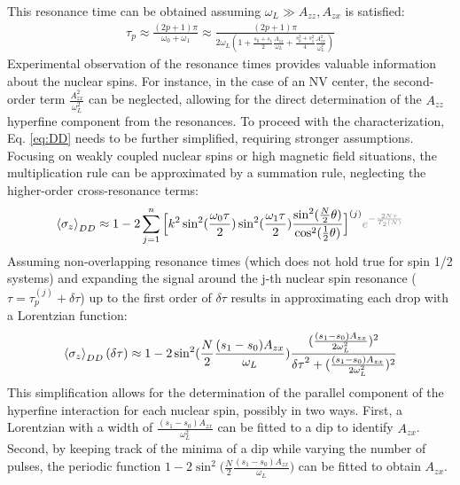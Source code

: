 \documentclass[%
 reprint,
superscriptaddress,
 amsmath,amssymb,
 aps,
]{revtex4-2}
\begin{document}
This resonance time can be obtained assuming $\omega_L \gg A_{zz}, A_{zx}$ is satisfied: 
\begin{gather} \label{eq:resonance}
	\tau_p \approx  \frac{(2p+1) \pi}{\omega_0 + \omega_1} \approx \frac{(2p+1)\pi}{2\omega_L(1+\frac{s_0+s_1}{2} \frac{A_{zz}}{\omega_L}+ \frac{s_0^2+s_1^2}{4}\frac{A_{zx}^2}{\omega_L^2})}
\end{gather}
Experimental observation of the resonance times provides valuable information about the nuclear spins.
For instance, in the case of an NV center, the second-order term $\frac{A_{zx}^2}{\omega_L^2}$ can be neglected, allowing for the direct determination of the $A_{zz}$ hyperfine component from the resonances.
To proceed with the characterization, Eq. \ref{eq:DD} needs to be further simplified, requiring stronger assumptions.
Focusing on weakly coupled nuclear spins or high magnetic field situations, the multiplication rule can be approximated by a summation rule, neglecting the higher-order cross-resonance terms:
\small
\begin{gather}
	\expval{\sigma_z}_{DD} \approx 1 -2
	\sum_{j=1}^n \Big[ k^2 	 \sin^2(\frac{\omega_0 \tau}{2}) \sin^2(\frac{\omega_1 \tau}{2}) \frac{\sin^2(\frac{N}{2} \theta)}{\cos^2(\frac{1}{2}\theta)}  \Big]^{(j)} \textcolor{gray}{ e^{-\frac{2N\tau}{T_2(N)}}}
	\label{eq:approx_DD}
\end{gather}
\normalsize
Assuming non-overlapping resonance times (which does not hold true for spin 1/2 systems) and expanding the signal around the j-th nuclear spin resonance ($\tau = \tau_p^{(j)}+\delta \tau$) up to the first order of $\delta \tau$ results in approximating each drop with a Lorentzian function:
\small
\begin{gather}
	\expval{\sigma_z}_{DD} (\delta \tau ) \approx 1 -2\sin^2(\frac{N}{2}\frac{(s_1-s_0)A_{zx}}{\omega_L}) \frac{(\frac{(s_1-s_0)A_{zx}}{2\omega_L^2})^2}{{\delta \tau}^2 +(\frac{(s_1-s_0)A_{zx}}{2\omega_L^2})^2}
\end{gather}
\normalsize
This simplification allows for the determination of the parallel component of the hyperfine interaction for each nuclear spin, possibly in two ways. First, a Lorentzian with a width of $\frac{(s_1-s_0) A_{zx}}{\omega_L^2}$ can be fitted to a dip to identify $A_{zx}$. Second, by keeping track of the minima of a dip while varying the number of pulses, the periodic function $1 - 2 \sin^2\big(\frac{N}{2}\frac{(s_1-s_0) A_{zx}}{\omega_L}\big)$ can be fitted to obtain $A_{zx}$.
\end{document}
